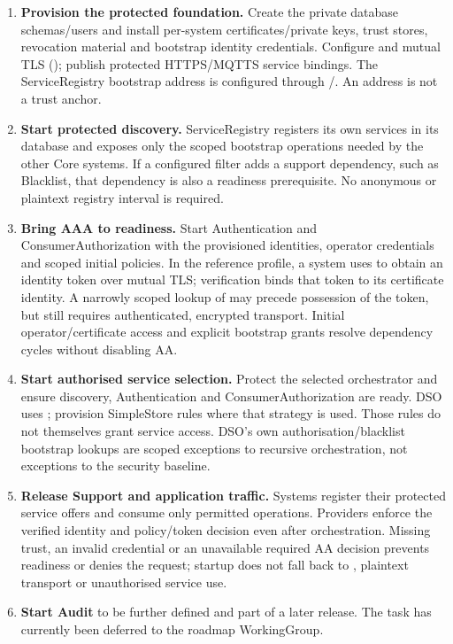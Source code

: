 \documentclass[a4paper]{arrowhead}
\newcommand{\svc}[1]{\textcolor{ArrowheadPurple}{\textit{\ahbreak{#1}}}}    %
\begin{document}
\begin{enumerate}
  \item \textbf{Provision the protected foundation.} Create the private database
        schemas/users and install per-system certificates/private keys, trust stores,
        revocation material and bootstrap identity credentials. Configure
         and mutual TLS
        (); publish protected HTTPS/MQTTS service
        bindings. The ServiceRegistry bootstrap address is configured through
        /. An address is not a trust anchor.
  \item \textbf{Start protected discovery.} ServiceRegistry registers its own services
        in its database and exposes only the scoped bootstrap operations needed by
        the other Core systems. If a configured filter adds a support dependency,
        such as Blacklist, that dependency is also a readiness prerequisite.
        No anonymous or plaintext registry interval is required.
  \item \textbf{Bring AAA to readiness.} Start Authentication and ConsumerAuthorization
        with the provisioned identities, operator credentials and scoped initial
        policies. In the reference  profile, a system uses
         to obtain an identity token over mutual TLS;
        verification binds that token to its certificate identity. A narrowly scoped
        lookup of \svc{identity} may precede possession of the token, but still requires
        authenticated, encrypted transport. Initial operator/certificate access and
        explicit bootstrap grants resolve dependency cycles without disabling AA.
  \item \textbf{Start authorised service selection.} Protect the selected orchestrator
        and ensure discovery, Authentication and ConsumerAuthorization are ready.
        DSO uses ; provision SimpleStore rules where
        that strategy is used. Those rules do not themselves grant service access. DSO's
        own authorisation/blacklist bootstrap lookups are scoped exceptions to
        recursive orchestration, not exceptions to the security baseline.
  \item \textbf{Release Support and application traffic.} Systems register their
        protected service offers and consume only permitted operations. Providers
        enforce the verified identity and policy/token decision even after
        orchestration. Missing trust, an invalid credential or an unavailable required
        AA decision prevents readiness or denies the request; startup does not fall
        back to , plaintext transport or unauthorised
        service use.
   \item \textbf{Start Audit} to be further defined and part of a
     later release. The task has currently been deferred to the roadmap WorkingGroup. 
        
\end{enumerate}
\end{document}
